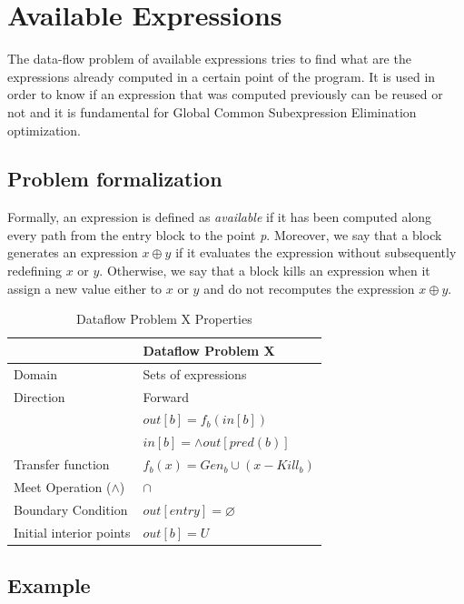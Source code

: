 \documentclass{article}
\begin{document}
\section{Available Expressions}

The data-flow problem of available expressions tries to find what are the expressions already computed in a certain point of the program. It is used in order to know if an expression that was computed previously can be reused or not and it is fundamental for Global Common Subexpression Elimination optimization.

\subsection{Problem formalization}

Formally, an expression is defined as \textit{available} if it has been computed along every path from the entry block to the point \textit{p}. Moreover, we say that a block generates an expression $x \oplus y$ if it evaluates the expression without subsequently redefining $x$ or $y$. Otherwise, we say that a block kills an expression when it assign a new value either to $x$ or $y$ and do not recomputes the expression $x \oplus y$.

\begin{table}[H]
\centering
\begin{tabular}{|p{}|p{}|}
\hline
 & \textbf{Dataflow Problem X} \\
\hline
Domain & Sets of expressions \\
\hline
Direction & Forward \\
 & $out[b] = f_b(in[b])$ \\
 & $in[b] = \wedge out[pred(b)]$ \\
\hline
Transfer function & $f_b(x) = Gen_b \cup (x - Kill_b)$ \\
\hline
Meet Operation ($\wedge$) & $\cap$ \\
\hline
Boundary Condition & $out[entry] = \varnothing$ \\
\hline
Initial interior points & $out[b] = U$ \\
\hline
\end{tabular}
\caption{Dataflow Problem X Properties}
\label{tab:dataflow_problem_x}
\end{table}

\subsection{Example}
\end{document}
